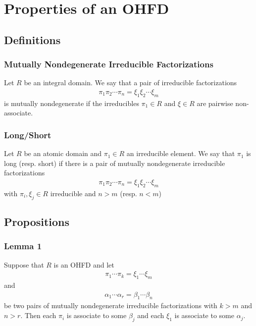 \section{Properties of an OHFD}

\subsection{Definitions}

\begin{frame}
  \frametitle{Mutually Nondegenerate Irreducible Factorizations}
  \begin{definition}
    Let $R$ be an integral domain. We say that a pair of irreducible factorizations
    \begin{align*}
      \pi_1\pi_2\cdots\pi_n = \xi_1\xi_2\cdots\xi_m
    \end{align*}
    is \alert{mutually nondegenerate} if the irreducibles $\pi_1 \in R$ and $\xi \in R$ are pairwise non-associate.
  \end{definition}
\end{frame}

\begin{frame}
  \frametitle{Long/Short}
  \begin{definition}
    Let $R$ be an atomic domain and $\pi_1 \in R$ an irreducible element.
    We say that $\pi_1$ is \alert{long} (resp. \alert{short}) if there is a pair of mutually nondegenerate irreducible factorizations
    \begin{align*}
      \pi_1\pi_2\cdots\pi_n = \xi_1\xi_2\cdots \xi_m
    \end{align*}
    with $\pi_i, \xi_j \in R$ irreducible and $n > m$ (resp. $n<m$)
  \end{definition}
\end{frame}

\subsection{Propositions}

\begin{frame}
  \frametitle{Lemma 1}
  \begin{lemma}
    Suppose that $R$ is an OHFD and let
    \begin{align*}
      \pi_1\cdots\pi_k=\xi_1\cdots\xi_m
    \end{align*}
    and
    \begin{align*}
      \alpha_1\cdots\alpha_r=\beta_1\cdots\beta_n
    \end{align*}
    be two pairs of mutually nondegenerate irreducible factorizations with $k>m$ and $n>r$.
    Then each $\pi_i$ is associate to some $\beta_j$ and each $\xi_1$ is associate to some $\alpha_j$. 
  \end{lemma}
\end{frame}

